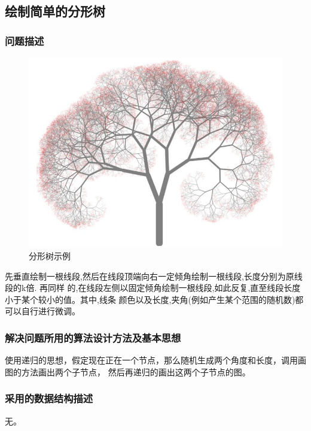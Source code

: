 \documentclass{ctexart}
\begin{document}
\newpage
\subsection{绘制简单的分形树}
\subsubsection{问题描述}
\begin{figure}[H]
	\centering
	\includegraphics[scale=0.5]{../images/demo-tree.png}
	\caption{分形树示例}
\end{figure}

先垂直绘制一根线段,然后在线段顶端向右一定倾角绘制一根线段,长度分别为原线段的k倍. 再同样
的,在线段左侧以固定倾角绘制一根线段,如此反复,直至线段长度小于某个较小的值。其中,线条
颜色以及长度,夹角(例如产生某个范围的随机数)都可以自行进行微调。

\subsubsection{解决问题所用的算法设计方法及基本思想}
使用递归的思想，假定现在正在一个节点，那么随机生成两个角度和长度，调用画图的方法画出两个子节点，
然后再递归的画出这两个子节点的图。
\subsubsection{采用的数据结构描述}
无。
\end{document}
